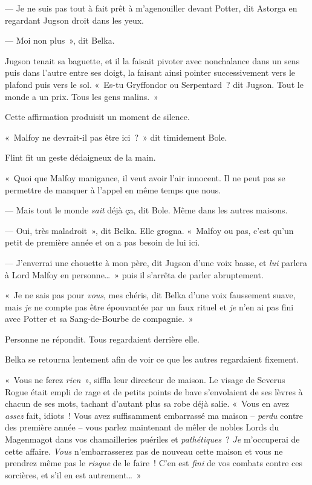 --- Je ne suis pas tout à fait prêt à m'agenouiller devant Potter, dit Astorga en regardant Jugson droit dans les yeux.

--- Moi non plus~», dit Belka.

Jugson tenait sa baguette, et il la faisait pivoter avec nonchalance dans un sens puis dans l'autre entre ses doigt, la faisant ainsi pointer successivement vers le plafond puis vers le sol.
«~Es-tu Gryffondor ou Serpentard~? dit Jugson.
Tout le monde a un prix.
Tous les gens malins.~»

Cette affirmation produisit un moment de silence.

«~Malfoy ne devrait-il pas être ici~?~»
dit timidement Bole.

Flint fit un geste dédaigneux de la main.

«~Quoi que Malfoy manigance, il veut avoir l'air innocent.
Il ne peut pas se permettre de manquer à l'appel en même temps que nous.

--- Mais tout le monde \emph{sait} déjà ça, dit Bole.
Même dans les autres maisons.

--- Oui, très maladroit~», dit Belka.
Elle grogna.
«~Malfoy ou pas, c'est qu'un petit de première année et on a pas besoin de lui ici.

--- J'enverrai une chouette à mon père, dit Jugson d'une voix basse, et \emph{lui} parlera à Lord Malfoy en personne…~»
puis il s'arrêta de parler abruptement.

«~Je ne sais pas pour \emph{vous}, mes chéris, dit Belka d'une voix faussement suave, mais \emph{je} ne compte pas être épouvantée par un faux rituel et \emph{je} n'en ai pas fini avec Potter et sa Sang-de-Bourbe de compagnie.~»

Personne ne répondit.
Tous regardaient derrière elle.

Belka se retourna lentement afin de voir ce que les autres regardaient fixement.

«~Vous ne ferez \emph{rien}~», siffla leur directeur de maison.
Le visage de Severus Rogue était empli de rage et de petits points de bave s'envolaient de ses lèvres à chacun de ses mots, tachant d'autant plus sa robe déjà salie.
«~Vous en avez \emph{assez} fait, idiots~!
Vous avez suffisamment embarrassé ma maison -- \emph{perdu} contre des première année -- vous parlez maintenant de mêler de nobles Lords du Magenmagot dans vos chamailleries puériles et \emph{pathétiques}~?
\emph{Je} m'occuperai de cette affaire.
\emph{Vous} n'embarrasserez pas de nouveau cette maison et vous ne prendrez même pas le \emph{risque} de le faire~!
C'en est \emph{fini} de vos combats contre ces sorcières, et s'il en est autrement…~»

